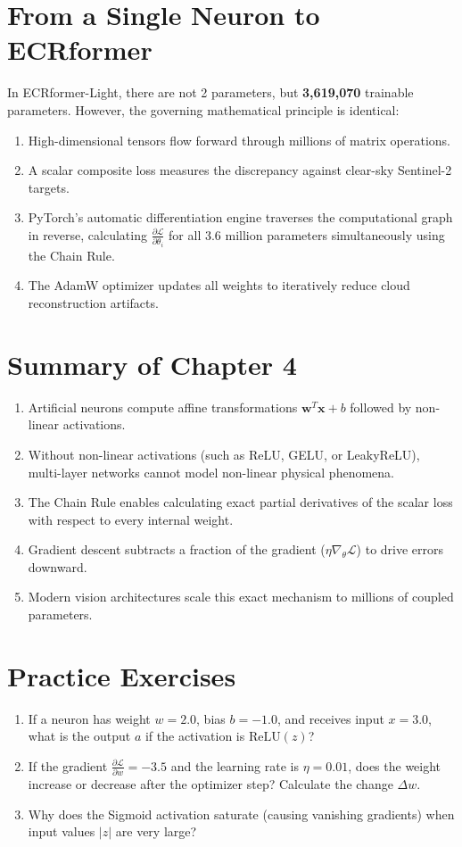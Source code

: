 \section{From a Single Neuron to ECRformer}
In ECRformer-Light, there are not 2 parameters, but \textbf{3,619,070} trainable parameters. However, the governing mathematical principle is identical:
\begin{enumerate}
    \item High-dimensional tensors flow forward through millions of matrix operations.
    \item A scalar composite loss measures the discrepancy against clear-sky Sentinel-2 targets.
    \item PyTorch's automatic differentiation engine traverses the computational graph in reverse, calculating $\frac{\partial \mathcal{L}}{\partial \theta_i}$ for all 3.6 million parameters simultaneously using the Chain Rule.
    \item The AdamW optimizer updates all weights to iteratively reduce cloud reconstruction artifacts.
\end{enumerate}

\section{Summary of Chapter 4}
\begin{enumerate}
    \item Artificial neurons compute affine transformations $\mathbf{w}^T\mathbf{x} + b$ followed by non-linear activations.
    \item Without non-linear activations (such as ReLU, GELU, or LeakyReLU), multi-layer networks cannot model non-linear physical phenomena.
    \item The Chain Rule enables calculating exact partial derivatives of the scalar loss with respect to every internal weight.
    \item Gradient descent subtracts a fraction of the gradient ($\eta \nabla_\theta \mathcal{L}$) to drive errors downward.
    \item Modern vision architectures scale this exact mechanism to millions of coupled parameters.
\end{enumerate}

\section{Practice Exercises}
\begin{enumerate}
    \item If a neuron has weight $w = 2.0$, bias $b = -1.0$, and receives input $x = 3.0$, what is the output $a$ if the activation is $\text{ReLU}(z)$?
    \item If the gradient $\frac{\partial \mathcal{L}}{\partial w} = -3.5$ and the learning rate is $\eta = 0.01$, does the weight increase or decrease after the optimizer step? Calculate the change $\Delta w$.
    \item Why does the Sigmoid activation saturate (causing vanishing gradients) when input values $|z|$ are very large?
\end{enumerate}

